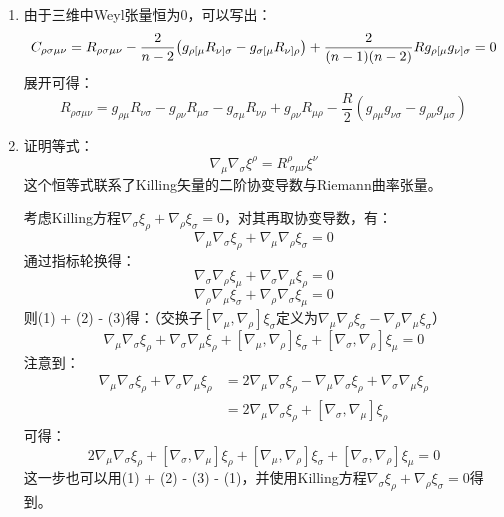 \documentclass[a4paper]{article}
\begin{document}
\begin{enumerate}
    \item[4.]
    由于三维中Weyl张量恒为0，可以写出：
    \[
        C_{\rho\sigma\mu\nu} = R_{\rho\sigma\mu\nu} - \frac{2}{n - 2} \qty(g_{\rho[\mu} R_{\nu]\sigma} - g_{\sigma[\mu} R_{\nu]\rho}) + \frac{2}{(n - 1) (n - 2)} R g_{\rho[\mu} g_{\nu]\sigma} = 0
    \]
    展开可得：
    \[
        R_{\rho\sigma\mu\nu} = g_{\rho\mu} R_{\nu\sigma} - g_{\rho\nu} R_{\mu\sigma} - g_{\sigma\mu} R_{\nu\rho} + g_{\rho\nu} R_{\mu\rho} - \frac{R}{2} (g_{\rho\mu} g_{\nu\sigma} - g_{\rho\nu} g_{\mu\sigma})
    \]

    \bigskip
    \item[10.(a)]
    证明等式：
    \[
        \nabla_\mu \nabla_\sigma \xi^\rho = R^\rho_{\ \sigma\mu\nu} \xi^\nu
    \]
    这个恒等式联系了Killing矢量的二阶协变导数与Riemann曲率张量。

    考虑Killing方程$\nabla_\sigma \xi_\rho + \nabla_\rho \xi_\sigma = 0$，对其再取协变导数，有：
    \begin{equation}
        \nabla_\mu \nabla_\sigma \xi_\rho + \nabla_\mu \nabla_\rho \xi_\sigma = 0
    \end{equation}
    通过指标轮换得：
    \begin{equation}
        \nabla_\sigma \nabla_\rho \xi_\mu + \nabla_\sigma \nabla_\mu \xi_\rho = 0
    \end{equation}
    \begin{equation}
        \nabla_\rho \nabla_\mu \xi_\sigma + \nabla_\rho \nabla_\sigma \xi_\mu = 0
    \end{equation}
    则(1) + (2) - (3)得：（交换子$[\nabla_\mu, \nabla_\rho] \xi_\sigma$定义为$\nabla_\mu \nabla_\rho \xi_\sigma - \nabla_\rho \nabla_\mu \xi_\sigma$）
    \[
        \nabla_\mu \nabla_\sigma \xi_\rho + \nabla_\sigma \nabla_\mu \xi_\rho + [\nabla_\mu, \nabla_\rho] \xi_\sigma + [\nabla_\sigma, \nabla_\rho] \xi_\mu = 0
    \]
    注意到：
    \begin{align*}
        \nabla_\mu \nabla_\sigma \xi_\rho + \nabla_\sigma \nabla_\mu \xi_\rho
        &= 2\nabla_\mu \nabla_\sigma \xi_\rho - \nabla_\mu \nabla_\sigma \xi_\rho + \nabla_\sigma \nabla_\mu \xi_\rho \\
        &= 2\nabla_\mu \nabla_\sigma \xi_\rho + [\nabla_\sigma, \nabla_\mu] \xi_\rho
    \end{align*}
    可得：
    \[
        2\nabla_\mu \nabla_\sigma \xi_\rho + [\nabla_\sigma, \nabla_\mu] \xi_\rho + [\nabla_\mu, \nabla_\rho] \xi_\sigma + [\nabla_\sigma, \nabla_\rho] \xi_\mu = 0
    \]
    这一步也可以用(1) + (2) - (3) - (1)，并使用Killing方程$\nabla_\sigma \xi_\rho + \nabla_\rho \xi_\sigma = 0$得到。


\end{enumerate}
\end{document}
